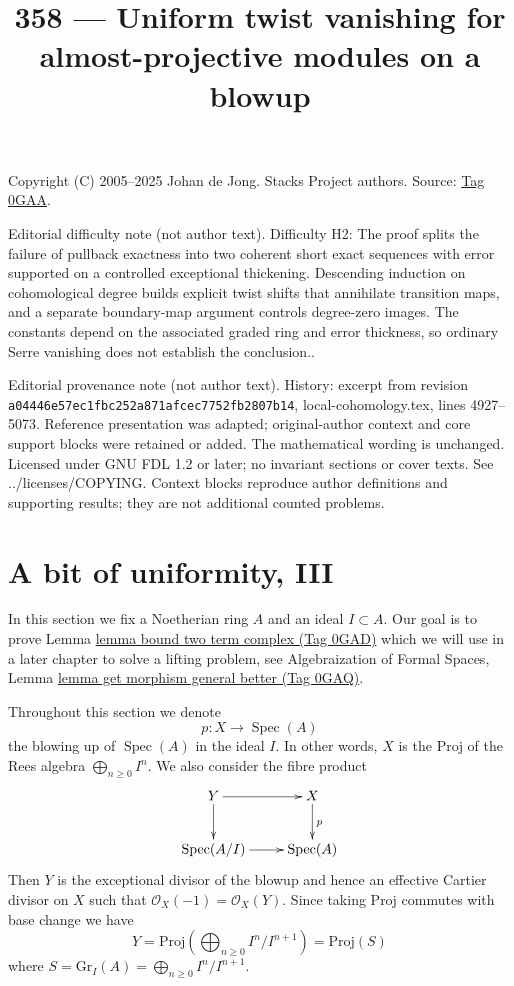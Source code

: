 \documentclass{amsart}
\theoremstyle{plain}
\theoremstyle{definition}
\theoremstyle{remark}
\numberwithin{equation}{subsection}
\def\Spec{\mathop{\mathrm{Spec}}}
\begin{document}
\title[Stacks Project, Tag 0GAA]{358 --- Uniform twist vanishing for almost-projective modules on a blowup}
\maketitle
\noindent Copyright (C) 2005--2025 Johan de Jong. Stacks Project authors. Source: \href{https://stacks.math.columbia.edu/tag/0GAA}{Tag 0GAA}.

\noindent Editorial difficulty note (not author text). Difficulty H2: The proof splits the failure of pullback exactness into two coherent short exact sequences with error supported on a controlled exceptional thickening. Descending induction on cohomological degree builds explicit twist shifts that annihilate transition maps, and a separate boundary-map argument controls degree-zero images. The constants depend on the associated graded ring and error thickness, so ordinary Serre vanishing does not establish the conclusion..

\noindent Editorial provenance note (not author text). History: excerpt from revision \texttt{a0444\allowbreak 6e57e\allowbreak c1fbc\allowbreak 252a8\allowbreak 71afc\allowbreak ec775\allowbreak 2fb28\allowbreak 07b14}, local-cohomology.tex, lines 4927--5073. Reference presentation was adapted; original-author context and core support blocks were retained or added. The mathematical wording is unchanged. Licensed under GNU FDL 1.2 or later; no invariant sections or cover texts. See ../licenses/COPYING. Context blocks reproduce author definitions and supporting results; they are not additional counted problems.

\section{A bit of uniformity, III}
\label{section-uniform}

\noindent
In this section we fix a Noetherian ring $A$ and an ideal $I \subset A$.
Our goal is to prove Lemma \href{https://stacks.math.columbia.edu/tag/0GAD}{lemma bound two term complex (Tag 0GAD)} which we will
use in a later chapter to solve a lifting problem, see
Algebraization of Formal Spaces, Lemma
\href{https://stacks.math.columbia.edu/tag/0GAQ}{lemma get morphism general better (Tag 0GAQ)}.

\medskip\noindent
Throughout this section we denote
$$
p : X \to \Spec(A)
$$
the blowing up of $\Spec(A)$ in the ideal $I$. In other words, $X$ is the
$\text{Proj}$ of the Rees algebra $\bigoplus_{n \geq 0} I^n$. We also consider
the fibre product
$$
\xymatrix{
Y \ar[r] \ar[d] & X \ar[d]^p \\
\Spec(A/I) \ar[r] & \Spec(A)
}
$$
Then $Y$ is the exceptional divisor of the blowup and hence
an effective Cartier divisor on $X$ such that
$\mathcal{O}_X(-1) = \mathcal{O}_X(Y)$. Since taking $\text{Proj}$
commutes with base change we have
$$
Y = \text{Proj}(\bigoplus\nolimits_{n \geq 0} I^n/I^{n + 1}) = \text{Proj}(S)
$$
where $S = \text{Gr}_I(A) = \bigoplus_{n \geq 0} I^n/I^{n + 1}$.
\end{document}
